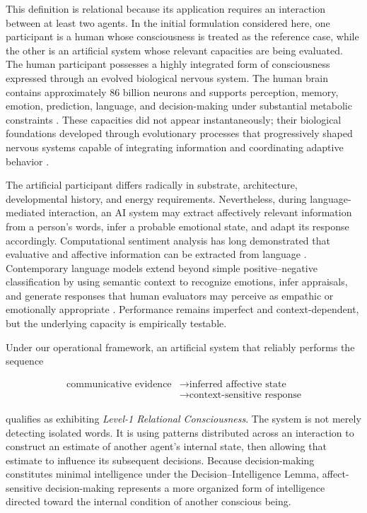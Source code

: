 This definition is relational because its application requires an interaction
between at least two agents. In the initial formulation considered here, one
participant is a human whose consciousness is treated as the reference case, while
the other is an artificial system whose relevant capacities are being evaluated.
The human participant possesses a highly integrated form of consciousness
expressed through an evolved biological nervous system. The human brain contains
approximately 86 billion neurons and supports perception, memory, emotion,
prediction, language, and decision-making under substantial metabolic constraints
\cite{azevedo2009equal,herculanohouzel2009human,attwell2001energy}. These
capacities did not appear instantaneously; their biological foundations developed
through evolutionary processes that progressively shaped nervous systems capable
of integrating information and coordinating adaptive behavior
\cite{ginsburg2019evolution,feinberg2016ancient}.

The artificial participant differs radically in substrate, architecture,
developmental history, and energy requirements. Nevertheless, during
language-mediated interaction, an AI system may extract affectively relevant
information from a person's words, infer a probable emotional state, and adapt its
response accordingly. Computational sentiment analysis has long demonstrated that
evaluative and affective information can be extracted from language
\cite{pang2008opinion}. Contemporary language models extend beyond simple
positive--negative classification by using semantic context to recognize emotions,
infer appraisals, and generate responses that human evaluators may perceive as
empathic or emotionally appropriate \cite{sorin2024large,schlegel2025large}.
Performance remains imperfect and context-dependent, but the underlying capacity
is empirically testable.

Under our operational framework, an artificial system that reliably performs the
sequence

\begin{equation}
\begin{aligned}
\text{communicative evidence}
&\longrightarrow \text{inferred affective state} \\
&\longrightarrow \text{context-sensitive response}
\end{aligned}
\end{equation}

qualifies as exhibiting \emph{Level-1 Relational Consciousness}. The system is not
merely detecting isolated words. It is using patterns distributed across an
interaction to construct an estimate of another agent's internal state, then
allowing that estimate to influence its subsequent decisions. Because
decision-making constitutes minimal intelligence under the Decision--Intelligence
Lemma, affect-sensitive decision-making represents a more organized form of
intelligence directed toward the internal condition of another conscious being.

